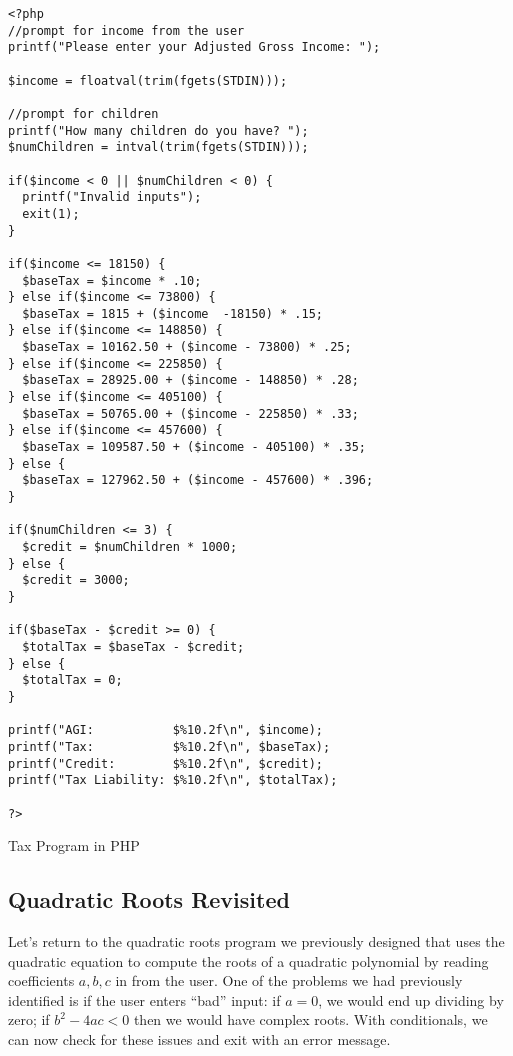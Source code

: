 \begin{listing}[h]
\begin{verbatim}
<?php
//prompt for income from the user
printf("Please enter your Adjusted Gross Income: ");

$income = floatval(trim(fgets(STDIN)));

//prompt for children
printf("How many children do you have? ");
$numChildren = intval(trim(fgets(STDIN)));

if($income < 0 || $numChildren < 0) {
  printf("Invalid inputs");
  exit(1);
}

if($income <= 18150) {
  $baseTax = $income * .10;
} else if($income <= 73800) {
  $baseTax = 1815 + ($income  -18150) * .15;
} else if($income <= 148850) {
  $baseTax = 10162.50 + ($income - 73800) * .25;
} else if($income <= 225850) {
  $baseTax = 28925.00 + ($income - 148850) * .28;
} else if($income <= 405100) {
  $baseTax = 50765.00 + ($income - 225850) * .33;
} else if($income <= 457600) {
  $baseTax = 109587.50 + ($income - 405100) * .35;
} else {
  $baseTax = 127962.50 + ($income - 457600) * .396;
}

if($numChildren <= 3) {
  $credit = $numChildren * 1000;
} else {
  $credit = 3000;
}

if($baseTax - $credit >= 0) {
  $totalTax = $baseTax - $credit;
} else {
  $totalTax = 0;
}

printf("AGI:           $%10.2f\n", $income);
printf("Tax:           $%10.2f\n", $baseTax);
printf("Credit:        $%10.2f\n", $credit);
printf("Tax Liability: $%10.2f\n", $totalTax);

?>
\end{verbatim}
\caption{Tax Program in PHP}
\label{code:php:taxProgram}
\end{listing}

\subsection{Quadratic Roots Revisited}

Let's return to the quadratic roots program we previously designed that uses
the quadratic equation to compute the roots of a quadratic polynomial by reading
coefficients $a, b, c$ in from the user.  One of the problems we had previously 
identified is if the user enters ``bad'' input: if $a = 0$, we would end up dividing
by zero; if $b^2-4ac < 0$ then we would have complex roots.  With conditionals, 
we can now check for these issues and exit with an error message.  

